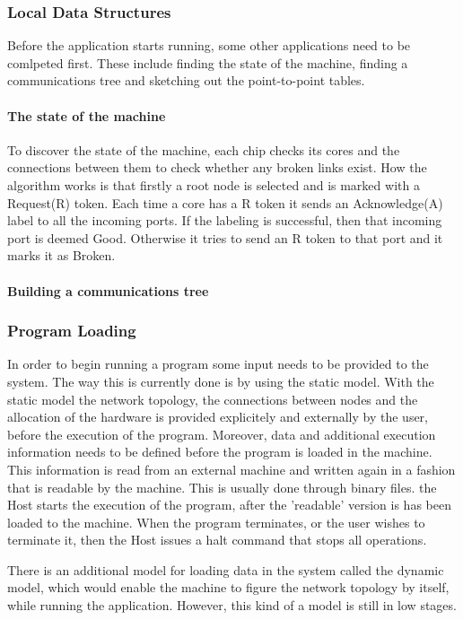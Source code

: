 \documentclass[12pt,a4paper]{article}
\begin{document}
\subsubsection{Local Data Structures}
Before the application starts running, some other applications need to be comlpeted first. These include finding the state of the machine, finding a communications tree and sketching out the point-to-point tables.

\paragraph{The state of the machine}
To discover the state of the machine, each chip checks its cores and the connections between them to check whether any broken links exist. How the algorithm works is that firstly a root node is selected and is marked with a Request(R) token. Each time a core has a R token it sends an Acknowledge(A) label to all the incoming ports. If the labeling is successful, then that incoming port is deemed Good. Otherwise it tries to send an R token to that port and it marks it as Broken.
\paragraph{Building a communications tree}

\subsubsection{Program Loading}
In order to begin running a program some input needs to be provided to the system. The way this is currently done is by using the static model. With the static model the network topology, the connections between nodes and the allocation of the hardware is provided explicitely and externally by the user, before the execution of the program. Moreover, data and additional execution information needs to be defined before the program is loaded in the machine. This information is read from an external machine and written again in a fashion that is readable by the machine. This is usually done through binary files. the Host starts the execution of the program, after the 'readable' version is has been loaded to the machine. When the program terminates, or the user wishes to terminate it, then the Host issues a halt command that stops all operations\cite{docfile}.

There is an additional model for loading data in the system called the dynamic model, which would enable the machine to figure the network topology by itself, while running the application. However, this kind of a model is still in low stages\cite{docfile}.
\end{document}
